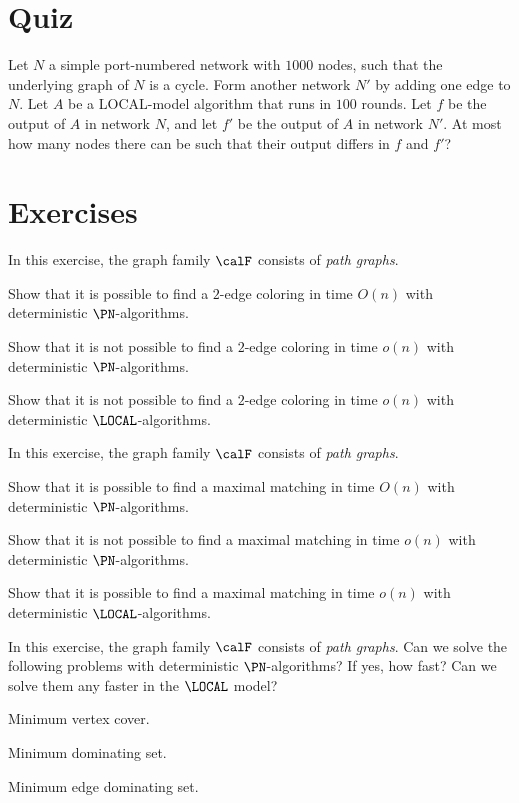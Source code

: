 \section{Quiz}

Let $N$ a simple port-numbered network with $1000$ nodes, such that the underlying graph of $N$ is a cycle. Form another network $N'$ by adding one edge to $N$. Let $A$ be a LOCAL-model algorithm that runs in $100$ rounds. Let $f$ be the output of $A$ in network $N$, and let $f'$ be the output of $A$ in network $N'$. At most how many nodes there can be such that their output differs in $f$ and $f'$?

\section{Exercises}

\begin{ex}
    In this exercise, the graph family $\calF$ consists of \emph{path graphs}.
    \begin{subex}
        \item Show that it is possible to find a $2$-edge coloring in time $O(n)$ with deterministic $\PN$-algorithms.
        \item Show that it is not possible to find a $2$-edge coloring in time $o(n)$ with deterministic $\PN$-algorithms.
        \item Show that it is not possible to find a $2$-edge coloring in time $o(n)$ with deterministic $\LOCAL$-algorithms.
    \end{subex}
\end{ex}

\begin{ex}
    In this exercise, the graph family $\calF$ consists of \emph{path graphs}.
    \begin{subex}
        \item Show that it is possible to find a maximal matching in time $O(n)$ with deterministic $\PN$-algorithms.
        \item Show that it is not possible to find a maximal matching in time $o(n)$ with deterministic $\PN$-algorithms.
        \item Show that it is possible to find a maximal matching in time $o(n)$ with deterministic $\LOCAL$-algorithms.
    \end{subex}
\end{ex}

\begin{ex}[optimization]
    In this exercise, the graph family $\calF$ consists of \emph{path graphs}. Can we solve the following problems with deterministic $\PN$-algorithms? If yes, how fast? Can we solve them any faster in the $\LOCAL$ model?
    \begin{subex}
        \item Minimum vertex cover.
        \item Minimum dominating set.
        \item Minimum edge dominating set.
    \end{subex}
\end{ex}

